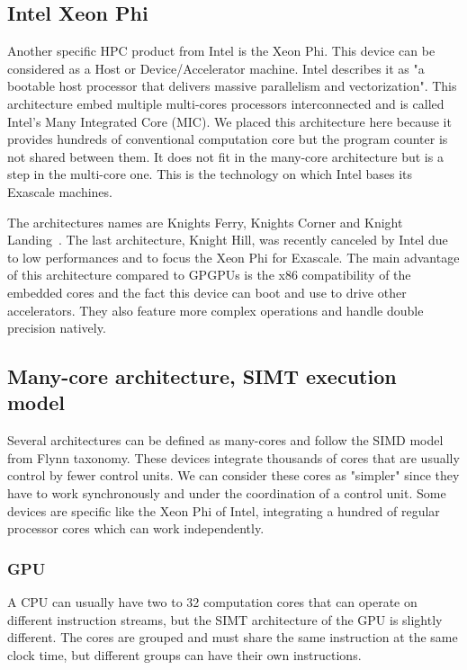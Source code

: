 \subsection{Intel Xeon Phi}
Another specific HPC product from Intel is the Xeon Phi. 
This device can be considered as a Host or Device/Accelerator machine. 
Intel describes it as "a bootable host processor that delivers massive parallelism and vectorization".
This architecture embed multiple multi-cores processors interconnected and is called Intel's Many Integrated Core (MIC).
We placed this architecture here because it provides hundreds of conventional computation core but the program counter is not shared between them. 
It does not fit in the many-core architecture but is a step in the multi-core one. 
This is the technology on which Intel bases its Exascale machines. 

The architectures names are Knights Ferry, Knights Corner and Knight Landing~\cite{sodani2016knights}. 
The last architecture, Knight Hill, was recently canceled by Intel due to low performances and to focus the Xeon Phi for Exascale.
The main advantage of this architecture compared to GPGPUs is the x86 compatibility of the embedded cores and the fact this device can boot and use to drive other accelerators. 
They also feature more complex operations and handle double precision natively.

\subsection{Many-core architecture, SIMT execution model}
Several architectures can be defined as many-cores and follow the SIMD model from Flynn taxonomy.
These devices integrate thousands of cores that are usually control by fewer control units. 
We can consider these cores as "simpler" since they have to work synchronously and under the coordination of a control unit.
Some devices are specific like the Xeon Phi of Intel, integrating a hundred of regular processor cores which can work independently. 

\subsubsection{GPU}
A CPU can usually have two to 32 computation cores that can operate on different instruction streams, but the SIMT architecture of the GPU is slightly different. 
The cores are grouped and must share the same instruction at the same clock time, but different groups can have their own instructions. 


